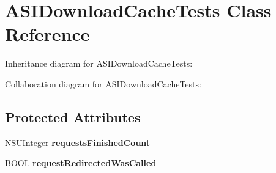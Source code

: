 \hypertarget{interface_a_s_i_download_cache_tests}{
\section{\-A\-S\-I\-Download\-Cache\-Tests \-Class \-Reference}
\label{interface_a_s_i_download_cache_tests}
}


\-Inheritance diagram for \-A\-S\-I\-Download\-Cache\-Tests\-:


\-Collaboration diagram for \-A\-S\-I\-Download\-Cache\-Tests\-:
\subsection*{\-Protected \-Attributes}
\begin{DoxyCompactItemize}
\item 
\hypertarget{interface_a_s_i_download_cache_tests_a09bb0a21f71e81d75a8fbc8713817716}{
\-N\-S\-U\-Integer {\bfseries requests\-Finished\-Count}}
\label{interface_a_s_i_download_cache_tests_a09bb0a21f71e81d75a8fbc8713817716}

\item 
\hypertarget{interface_a_s_i_download_cache_tests_a718abc95c0855deb31f0fa68fb5d6b18}{
\-B\-O\-O\-L {\bfseries request\-Redirected\-Was\-Called}}
\label{interface_a_s_i_download_cache_tests_a718abc95c0855deb31f0fa68fb5d6b18}

\end{DoxyCompactItemize}


